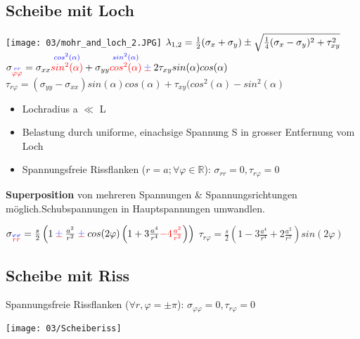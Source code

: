     \subsection{Scheibe mit Loch}
        \begin{center}
            \texttt{[image: 03/mohr\_and\_loch\_2.JPG]}
            $\tiny{\lambda_{1,2}= \frac{1}{2}(\sigma_x+\sigma_y)\pm\sqrt{\frac{1}{4}(\sigma_x-\sigma_y)^2+\tau_{xy}^2}}$\\
            $\sigma_{\overset{\textcolor{blue}{rr}}{\textcolor{red}{\varphi\varphi}}}=\sigma_{xx}\overset{\textcolor{blue}{cos^2(\alpha)}}{\textcolor{red}{sin^2(\alpha)}}+\sigma_{yy}\overset{\textcolor{blue}{sin^2(\alpha)}}{\textcolor{red}{cos^2(\alpha)}} \cpm 2\tau_{xy}sin(\alpha)cos(\alpha)$\\
            $\tau_{r\varphi}=(\sigma_{yy}-\sigma_{xx})sin(\alpha)cos(\alpha)+\tau_{xy}(cos^2(\alpha)-sin^2(\alpha)$
        \end{center}
\columnbreak
        \begin{itemize}
            \item Lochradius a $\ll$ L
            \item Belastung durch uniforme, einachsige Spannung S in grosser Entfernung vom Loch
            \item Spannungsfreie Rissflanken ($r = a; \forall\varphi\in\mathbb{R} $): $\sigma_{rr}=0, \tau_{r\varphi}=0$
        \end{itemize}
        \textbf{Superposition} von mehreren Spannungen \& Spannungsrichtungen möglich.Schubspannungen in Hauptspannungen umwandlen.
        \begin{center}
            $\sigma_{\overset{\textcolor{blue}{\varphi\varphi}}{\textcolor{red}{rr}}}=\frac{s}{2}\left(1\cpm\frac{a^2}{r^2}\cpm cos(2\varphi)\left(1+3\frac{a^4}{r^4}\textcolor{red}{-4\frac{a^2}{r^2}}\right)\right)$
            $\tau_{r\varphi}=\frac{s}{2}\left(1-3\frac{a^4}{r^4}+2\frac{a^2}{r^2}\right)sin(2\varphi)$
        \end{center}

    \subsection{Scheibe mit Riss}
        Spannungsfreie Rissflanken ($\forall r, \varphi=\pm\pi$): $\sigma_{\varphi\varphi}=0, \tau_{r\varphi}=0$
        \begin{center}
            \texttt{[image: 03/Scheiberiss]}
        \end{center}
\vspace{-2mm}
